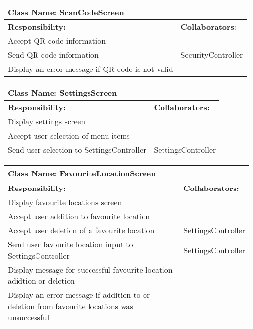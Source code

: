 \documentclass[english]{article}
\begin{document}
    \begin{table}[!ht]
        \centering
        \begin{tabular}{|p{8cm}|p{4cm}|}
        \hline 
        \multicolumn{2}{|l|}{\textbf{Class Name: ScanCodeScreen}} \\
        \hline
        \textbf{Responsibility:} & \textbf{Collaborators:} \\
        \hline
        Accept QR code information & \\
        \hline
        Send QR code information & SecurityController\\
        \hline 
        Display an error message if QR code is not valid & \\
        \hline
        \end{tabular}
    \end{table}
    
    \begin{table}[!ht]
        \centering
        \begin{tabular}{|p{8cm}|p{4cm}|}
        \hline 
        \multicolumn{2}{|l|}{\textbf{Class Name: SettingsScreen}} \\
        \hline
        \textbf{Responsibility:} & \textbf{Collaborators:} \\
        \hline
        Display settings screen &  \\
        \hline
        Accept user selection of menu items & \\
        \hline
        Send user selection to SettingsController & SettingsController \\
        \hline
        \end{tabular}
    \end{table}
    
    \begin{table}[!ht]
        \centering
        \begin{tabular}{|p{8cm}|p{4cm}|}
        \hline 
        \multicolumn{2}{|l|}{\textbf{Class Name: FavouriteLocationScreen}} \\
        \hline
        \textbf{Responsibility:} & \textbf{Collaborators:} \\
        \hline
        Display favourite locations screen & \\
        \hline
        Accept user addition to favourite location & \\
        \hline
        Accept user deletion of a favourite location & SettingsController\\
        \hline
        Send user favourite location input to SettingsController & SettingsController\\
        \hline
        Display message for successful favourite location adidtion or deletion & \\
        \hline
        Display an error message if addition to or deletion from favourite locations was unsuccessful & \\
        \hline
        \end{tabular}
    \end{table}
    
\end{document}
